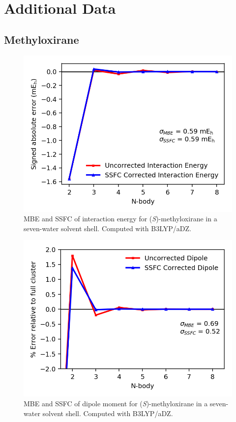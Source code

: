 \section{Additional Data} \label{data}
    \subsection{Methyloxirane}
    \begin{figure}
        \centering
        \includegraphics[scale=0.75]{p1/graphs/si/metox_7_b3_int.png}
        \caption{MBE and SSFC of interaction energy for (\textit{S})-methyloxirane in a seven-water solvent shell. Computed with B3LYP/aDZ.}
        \label{metox_7_b3_int}
    \end{figure}
    \begin{figure}
        \centering
        \includegraphics[scale=0.75]{p1/graphs/si/metox_7_b3_dip.png}
        \caption{MBE and SSFC of dipole moment for (\textit{S})-methyloxirane in a seven-water solvent shell. Computed with B3LYP/aDZ.}
        \label{metox_7_b3_dip}
    \end{figure}

